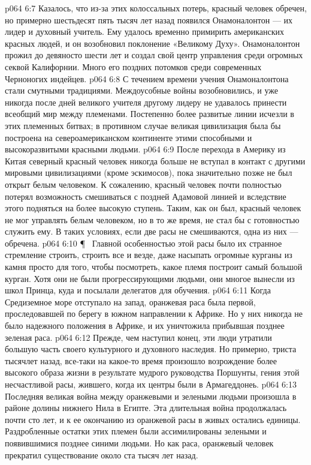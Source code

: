 \vs p064 6:7 Казалось, что из\hyp{}за этих колоссальных потерь, красный человек обречен, но примерно шестьдесят пять тысяч лет назад появился Онамоналонтон --- их лидер и духовный учитель. Ему удалось временно примирить американских красных людей, и он возобновил поклонение «Великому Духу». Онамоналонтон прожил до девяносто шести лет и создал свой центр управления среди огромных секвой Калифорнии. Много его поздних потомков среди современных Черноногих индейцев.
\vs p064 6:8 С течением времени учения Онамоналонтона стали смутными традициями. Междоусобные войны возобновились, и уже никогда после дней великого учителя другому лидеру не удавалось принести всеобщий мир между племенами. Постепенно более развитые линии исчезли в этих племенных битвах; в противном случае великая цивилизация была бы построена на североамериканском континенте этими способными и высокоразвитыми красными людьми.
\vs p064 6:9 После перехода в Америку из Китая северный красный человек никогда больше не вступал в контакт с другими мировыми цивилизациями (кроме эскимосов), пока значительно позже не был открыт белым человеком. К сожалению, красный человек почти полностью потерял возможность смешиваться с поздней Адамовой линией и вследствие этого подняться на более высокую ступень. Таким, как он был, красный человек не мог управлять белым человеком, но в то же время, не стал бы с готовностью служить ему. В таких условиях, если две расы не смешиваются, одна из них --- обречена.
\vs p064 6:10 \P\ \bibnobreakspace {} Главной особенностью этой расы было их странное стремление строить, строить все и везде, даже насыпать огромные курганы из камня просто для того, чтобы посмотреть, какое племя построит самый большой курган. Хотя они не были прогрессирующими людьми, они многое вынесли из школ Принца, куда и посылали делегатов для обучения.
\vs p064 6:11 Когда Средиземное море отступало на запад, оранжевая раса была первой, проследовавшей по берегу в южном направлении к Африке. Но у них никогда не было надежного положения в Африке, и их уничтожила прибывшая позднее зеленая раса.
\vs p064 6:12 Прежде, чем наступил конец, эти люди утратили большую часть своего культурного и духовного наследия. Но примерно, триста тысячлет назад, все\hyp{}таки на какое\hyp{}то время произошло возрождение более высокого образа жизни в результате мудрого руководства Поршунты, гения этой несчастливой расы, жившего, когда их центры были в Армагеддонеь.
\vs p064 6:13 Последняя великая война между оранжевыми и зелеными людьми произошла в районе долины нижнего Нила в Египте. Эта длительная война продолжалась почти сто лет, и к ее окончанию из оранжевой расы в живых остались единицы. Раздробленные остатки этих племен были ассимилированы зелеными и появившимися позднее синими людьми. Но как раса, оранжевый человек прекратил существование около ста тысяч лет назад.
